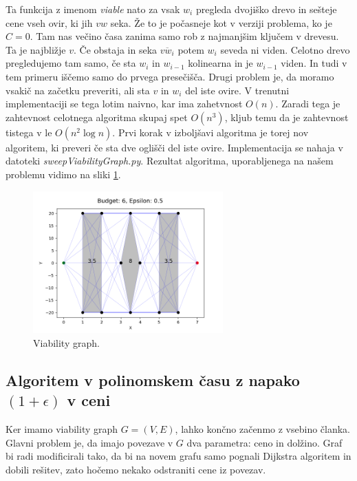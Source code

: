 \documentclass{article}
\begin{document}
Ta funkcija z imenom \emph{viable} nato za vsak $w_i$ pregleda dvojiško drevo in sešteje cene vseh ovir, ki jih $vw$ seka. Že to je počasneje kot v verziji problema, ko je $C = 0$. Tam nas večino časa zanima samo rob z najmanjšim ključem v drevesu. Ta je najbližje $v$. Če obstaja in seka $\overline{vw_i}$ potem $w_i$ seveda ni viden. Celotno drevo pregledujemo tam samo, če sta $w_i$ in $w_{i-1}$ kolinearna in je $w_{i-1}$ viden. In tudi v tem primeru iščemo samo do prvega presečišča. Drugi problem je, da moramo vsakič na začetku preveriti, ali sta $v$ in $w_i$ del iste ovire. V trenutni implementaciji se tega lotim naivno, kar ima zahetvnost $O(n)$. Zaradi tega je zahtevnost celotnega algoritma skupaj spet $O(n^3)$, kljub temu da je zahtevnost tistega v \cite{BCKO} le $O(n^2 \log n)$. Prvi korak v izboljšavi algoritma je torej nov algoritem, ki preveri če sta dve oglišči del iste ovire. Implementacija se nahaja v datoteki \emph{sweepViabilityGraph.py}. Rezultat algoritma, uporabljenega na našem problemu vidimo na sliki \ref{fig:errG1}.

\begin{figure}[h]
    \centering
    \includegraphics[width=0.65\textwidth]{errGraph1.png}
    \caption{Viability graph.}
    \label{fig:errG1}
\end{figure}

 
\subsection*{Algoritem v polinomskem času z napako $(1+\epsilon)$ v ceni}

Ker imamo viability graph $G = (V,E)$, lahko končno začenmo z vsebino članka. Glavni problem je, da imajo povezave v $G$ dva parametra: ceno in dolžino.
Graf bi radi modificirali tako, da bi na novem grafu samo pognali Dijkstra algoritem in dobili rešitev, zato hočemo nekako odstraniti cene iz povezav. 
\end{document}
